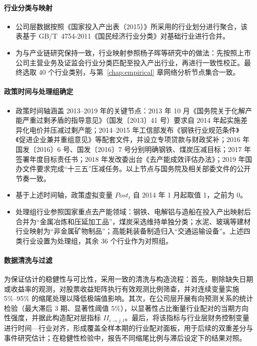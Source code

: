 \paragraph{行业分类与映射}
\begin{itemize}
    \item 公司层数据按照《国家投入产出表（2015）》所采用的行业划分进行聚合，该表基于 GB/T~4754-2011《国民经济行业分类》对基础行业进行合并。
    \item 为与产业链研究保持一致，行业映射参照杨子晖等研究中的做法：先按照上市公司主营业务及证监会行业分类匹配至投入产出行业，再进行一致性校正。最终选取 40 个行业类别，与第~\ref{chap:empirical} 章网络分析节点集合一致。
\end{itemize}

\paragraph{政策时间与处理组确定}
\label{sec:policy_timeline}
\begin{itemize}
    \item 政策时间轴涵盖 2013--2019 年的关键节点：2013 年 10 月《国务院关于化解产能严重过剩矛盾的指导意见》（国发〔2013〕41 号）要求自 2014 年起实施差异化电价并压减过剩产能；2014--2015 年工信部发布《钢铁行业规范条件》《促进企业兼并重组意见》等配套文件，并设立专项贷款与财政奖补；2016 年国发〔2016〕6 号、国发〔2016〕7 号分别明确钢铁、煤炭压减目标；2017 年签署年度目标责任书；2018 年发改委出台《去产能成效评估办法》；2019 年国办文件要求完成“十三五”压减任务。以上节点与国务院及相关部委文件的公开节奏一致。
    \item 基于上述时间轴，政策虚拟变量 \(Post_t\) 自 2014 年 1 月起取值 1，之前为 0。
    \item 处理组行业参照国家重点去产能领域：钢铁、电解铝与造船在投入产出映射后合并为“金属冶炼和压延加工品”，煤炭采选维持单独分类；水泥、玻璃等建材行业映射为“非金属矿物制品”；高能耗装备制造归入“交通运输设备”。上述四类行业设置为处理组，其余 36 个行业作为对照组。
\end{itemize}

\paragraph{数据清洗与过滤}
为保证估计的稳健性与可比性，采用一致的清洗与构造流程：首先，剔除缺失日期或收益率的观测，对股票收益矩阵执行有效观测比例筛查，并对连续变量实施 5\%--95\% 的缩尾处理以降低极端值影响。其次，在公司层开展有向预测关系的统计检验（最大滞后 3 期、显著性阈值 5\%），以显著性占比衡量行业配对的当期方向性强度，并据此构造配对层指标 \(II_{i\to j,t}\)。最后，将该指标与行业层财务控制变量进行时间—行业对齐，形成覆盖全样本期的行业配对面板，用于后续的双重差分与事件研究估计；在稳健性检验中，报告不同缩尾比例与滞后设定下的结果对照。
